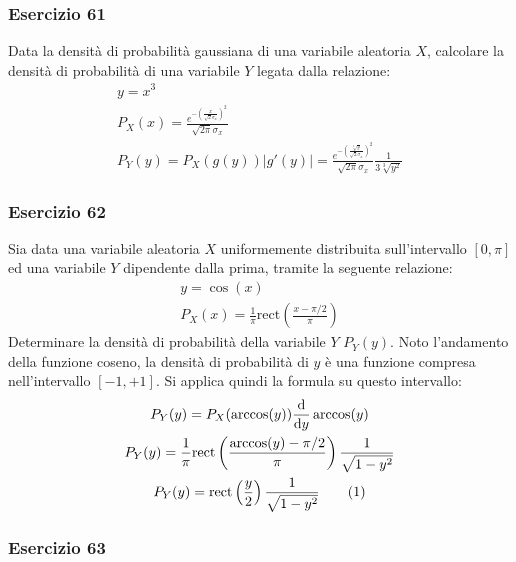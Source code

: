 \documentclass{article}
\newcommand{\rect}{\mathrm{rect}}
\newcommand{\df}{\mathrm{d}}
\newcommand{\tageq}{\tag{\stepcounter{equation}\theequation}}
\begin{document}
\subsubsection*{Esercizio 61}

Data la densità di probabilità gaussiana di una variabile aleatoria $X$, calcolare la densità di probabilità di una variabile $Y$ legata dalla relazione:
\begin{gather*}
    y=x^3\\
    P_X(x)=\displaystyle\frac{e^{-\left(\frac{x}{\sqrt{2}{\sigma_x}}\right)^2}}{\sqrt{2\pi}\sigma_x}\\
    P_Y(y)=P_X(g(y))|g'(y)|=\displaystyle\frac{e^{-\left(\frac{\sqrt[3]{y}}{\sqrt{2}{\sigma_x}}\right)^2}}{\sqrt{2\pi}\sigma_x}\frac{1}{3\sqrt[3]{y^2}}
\end{gather*}

\subsubsection*{Esercizio 62}

Sia data una variabile aleatoria $X$ uniformemente distribuita sull'intervallo $[0,\pi]$ ed una variabile $Y$ dipendente dalla prima, tramite la seguente relazione:
\begin{gather*}
    y=\cos(x)\\
    P_X(x)=\displaystyle\frac{1}{\pi}\rect\left(\frac{x-\pi/2}{\pi}\right)
\end{gather*}
Determinare la densità di probabilità della variabile $Y$ $P_Y(y)$. Noto l'andamento della funzione coseno, la densità di probabilità di $y$ è una funzione 
compresa nell'intervallo $[-1,+1]$. Si applica quindi la formula su questo intervallo:
\begin{gather*}
    P_Y(y)=P_X(\arccos(y))\displaystyle\frac{\df}{\df y}\arccos(y)\\
    P_Y(y)=\displaystyle\frac{1}{\pi}\rect\left(\frac{\arccos(y)-\pi/2}{\pi}\right)\frac{1}{\sqrt{1-y^2}}\\
    P_Y(y)=\displaystyle\rect\left(\frac{y}{2}\right)\frac{1}{\sqrt{1-y^2}}\tageq
\end{gather*}

\subsubsection*{Esercizio 63}
\end{document}
